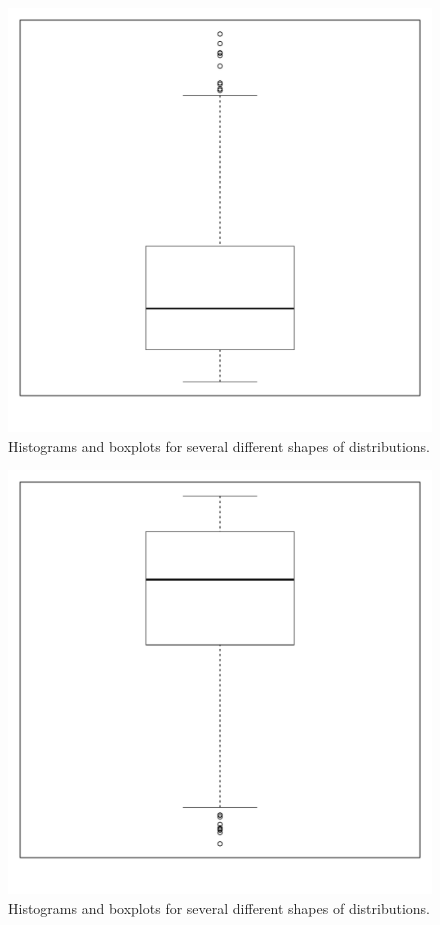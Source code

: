 \begin{knitrout}
\begin{figure}
\includegraphics[width=.3\linewidth]{figure/BoxplotShape-5} \caption[Histograms and boxplots for several different shapes of distributions]{Histograms and boxplots for several different shapes of distributions.}\label{fig:BoxplotShape5}
\end{figure}

\begin{figure}
\includegraphics[width=.3\linewidth]{figure/BoxplotShape-6} \caption[Histograms and boxplots for several different shapes of distributions]{Histograms and boxplots for several different shapes of distributions.}\label{fig:BoxplotShape6}
\end{figure}


\end{knitrout}


\vspace{-12pt}

